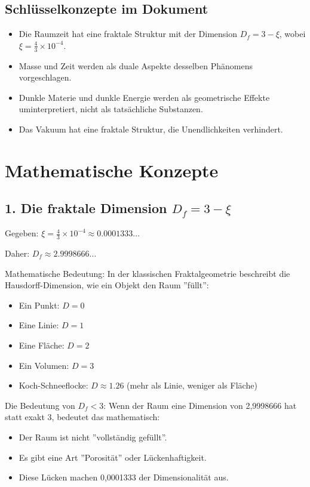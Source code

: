 	\subsection{Schlüsselkonzepte im Dokument}
	\begin{itemize}
		\item Die Raumzeit hat eine fraktale Struktur mit der Dimension \( D_f = 3 - \xi \), wobei \( \xi = \frac{4}{3} \times 10^{-4} \).
		\item Masse und Zeit werden als duale Aspekte desselben Phänomens vorgeschlagen.
		\item Dunkle Materie und dunkle Energie werden als geometrische Effekte uminterpretiert, nicht als tatsächliche Substanzen.
		\item Das Vakuum hat eine fraktale Struktur, die Unendlichkeiten verhindert.
	\end{itemize}
	
	\section{Mathematische Konzepte}
	
	\subsection{1. Die fraktale Dimension \( D_f = 3 - \xi \)}
	Gegeben: \( \xi = \frac{4}{3} \times 10^{-4} \approx 0.0001333\ldots \)
	
	Daher: \( D_f \approx 2.9998666\ldots \)
	
	Mathematische Bedeutung:
	In der klassischen Fraktalgeometrie beschreibt die Hausdorff-Dimension, wie ein Objekt den Raum ''füllt'':
	\begin{itemize}
		\item Ein Punkt: \( D = 0 \)
		\item Eine Linie: \( D = 1 \)
		\item Eine Fläche: \( D = 2 \)
		\item Ein Volumen: \( D = 3 \)
		\item Koch-Schneeflocke: \( D \approx 1.26 \) (mehr als Linie, weniger als Fläche)
	\end{itemize}
	
	Die Bedeutung von \( D_f < 3 \):
	Wenn der Raum eine Dimension von 2,9998666 hat statt exakt 3, bedeutet das mathematisch:
	\begin{itemize}
		\item Der Raum ist nicht ''vollständig gefüllt''.
		\item Es gibt eine Art ''Porosität'' oder Lückenhaftigkeit.
		\item Diese Lücken machen 0,0001333 der Dimensionalität aus.
	\end{itemize}
	
